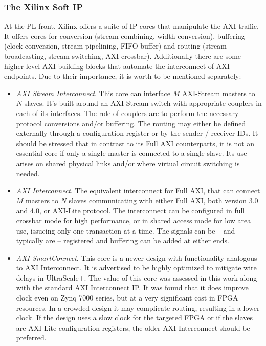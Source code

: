 \subsubsection{The Xilinx Soft IP}

At the PL front, Xilinx offers a suite of IP cores that manipulate the AXI traffic.
It offers cores for conversion (stream combining, width conversion), buffering (clock conversion,
stream pipelining, FIFO buffer) and routing (stream broadcasting, stream switching, AXI crossbar).
Additionally there are some higher level AXI building blocks that automate the interconnect of
AXI endpoints. Due to their importance, it is worth to be mentioned separately:

\begin{itemize}
\item	\textit{AXI Stream Interconnect}. This core can interface $M$ AXI-Stream masters to $N$ slaves.
	It's built around an AXI-Stream switch with appropriate couplers in each of its interfaces.
	The role of couplers are to perform the necessary protocol conversions and/or buffering.
	The routing may either be defined externally through a configuration register or by
	the sender / receiver IDs. It should be stressed that in contrast to its Full AXI
	counterparts, it is not an essential core if only a single master is connected to a single slave.
	Its use arises on shared physical links and/or where virtual circuit switching is needed.
\item	\textit{AXI Interconnect}. The equivalent interconnect for Full AXI, that can connect $M$ masters
	to $N$ slaves communicating with either Full AXI, both version 3.0 and 4.0, or AXI-Lite protocol.
	The interconnect can be configured in full crossbar mode for high performance,
	or in shared access mode for low area use, issueing only one transaction at a time.
	The signals can be -- and typically are -- registered and buffering can be added at either ends.
\item	\textit{AXI SmartConnect}. This core is a newer design with functionality analogous to AXI Interconnect.
	It is advertised to be highly optimized to mitigate wire delays in UltraScale+.
	The value of this core was assessed in this work along with the standard AXI Interconnect IP.
	It was found that it does improve clock even on Zynq 7000 series, but at a very significant cost
	in FPGA resources. In a crowded design it may complicate routing, resulting in a lower clock.
	If the design uses a slow clock for the targeted FPGA or 
	if the slaves are AXI-Lite configuration registers,
	the older AXI Interconnect should be preferred.
\end{itemize}

